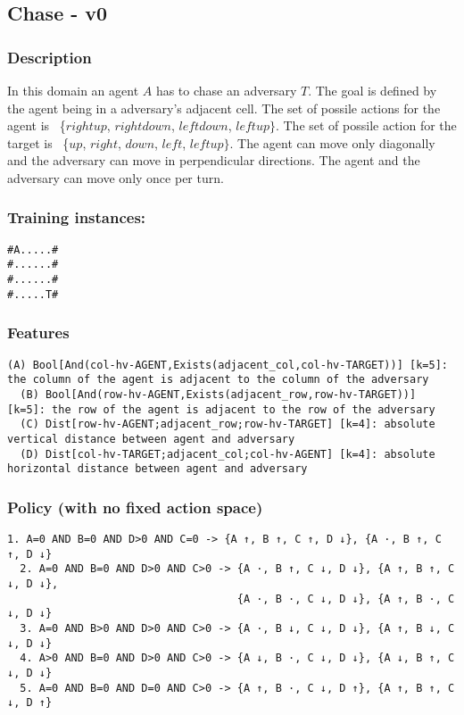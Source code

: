 \documentclass[a4paper]{article}
\begin{document}
\subsection{Chase - v0}
\subsubsection{Description}
In this domain an agent $A$ has to chase an adversary $T$. The goal is defined by the agent being in a adversary's adjacent cell. The set of possile actions for the agent is ~\{$rightup$, $rightdown$, $leftdown$, $leftup\}$.
The set of possile action for the target is ~\{$up$, $right$, $down$, $left$, $leftup\}$. The agent can move only diagonally and the adversary can move in perpendicular directions.  The agent and the adversary can move only once per turn.

\subsubsection{Training instances:}
\begin{Verbatim}[fontsize=\footnotesize]
#A.....#
#......#
#......#
#.....T#
\end{Verbatim}

\subsubsection{Features}
\begin{Verbatim}[fontsize=\footnotesize]
  (A) Bool[And(col-hv-AGENT,Exists(adjacent_col,col-hv-TARGET))] [k=5]: the column of the agent is adjacent to the column of the adversary
  (B) Bool[And(row-hv-AGENT,Exists(adjacent_row,row-hv-TARGET))] [k=5]: the row of the agent is adjacent to the row of the adversary
  (C) Dist[row-hv-AGENT;adjacent_row;row-hv-TARGET] [k=4]: absolute vertical distance between agent and adversary
  (D) Dist[col-hv-TARGET;adjacent_col;col-hv-AGENT] [k=4]: absolute horizontal distance between agent and adversary
\end{Verbatim}

\subsubsection{Policy (with no fixed action space)}

\begin{Verbatim}[fontsize=\footnotesize]
  1. A=0 AND B=0 AND D>0 AND C=0 -> {A ↑, B ↑, C ↑, D ↓}, {A ·, B ↑, C ↑, D ↓}
  2. A=0 AND B=0 AND D>0 AND C>0 -> {A ·, B ↑, C ↓, D ↓}, {A ↑, B ↑, C ↓, D ↓},
                                    {A ·, B ·, C ↓, D ↓}, {A ↑, B ·, C ↓, D ↓}
  3. A=0 AND B>0 AND D>0 AND C>0 -> {A ·, B ↓, C ↓, D ↓}, {A ↑, B ↓, C ↓, D ↓}
  4. A>0 AND B=0 AND D>0 AND C>0 -> {A ↓, B ·, C ↓, D ↓}, {A ↓, B ↑, C ↓, D ↓}
  5. A=0 AND B=0 AND D=0 AND C>0 -> {A ↑, B ·, C ↓, D ↑}, {A ↑, B ↑, C ↓, D ↑}


\end{Verbatim}
\end{document}
